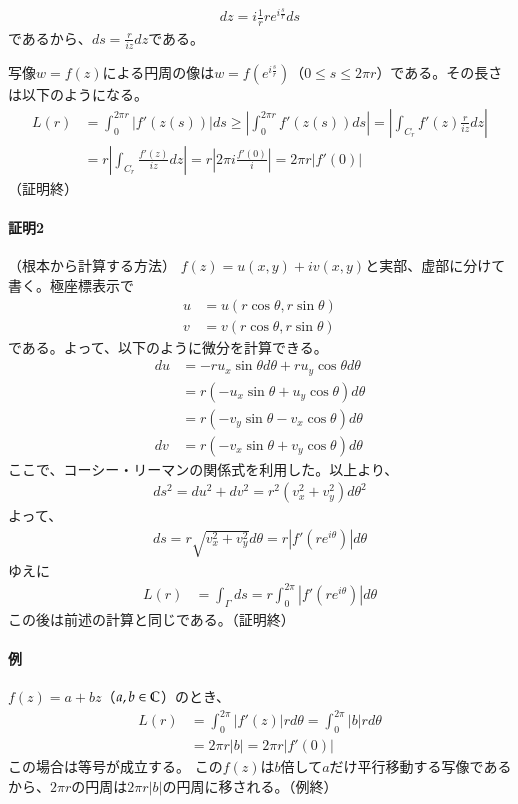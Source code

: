 \begin{align*}
    dz
    =i\frac{1}{r}re^{i\frac{s}{r}}ds
\end{align*}
であるから、$ds=\frac{r}{iz}dz$である。

写像$w=f(z)$による円周の像は$w=f(e^{i\frac{s}{r}})$（$0\le s\le2\pi r$）である。その長さは以下のようになる。
\begin{align*}
    L(r)&=\int_{0}^{2\pi r}|f'(z(s))|ds
    \ge \left|\int_{0}^{2\pi r}f'(z(s))ds\right|
    =\left|\int_{C_r}f'(z)\frac{r}{iz}dz\right|\\
    &=r\left|\int_{C_r}\frac{f'(z)}{iz}dz\right|
    =r\left|2\pi i \frac{f'(0)}{i}\right|
    =2\pi r|f'(0)|
\end{align*}
（証明終）
\paragraph{証明2}（根本から計算する方法）
$f(z)=u(x,y)+iv(x,y)$と実部、虚部に分けて書く。極座標表示で
\begin{align*}
    u&=u(r\cos\theta,r\sin\theta)\\
    v&=v(r\cos\theta,r\sin\theta)
\end{align*}
である。よって、以下のように微分を計算できる。
\begin{align*}
    du&=-ru_x\sin\theta d\theta+ru_y\cos\theta d\theta\\
    &=r(-u_x\sin\theta+u_y\cos\theta)d\theta\\
    &=r(-v_y\sin\theta-v_x\cos\theta)d\theta\\
    dv&=r(-v_x\sin\theta+v_y\cos\theta)d\theta
\end{align*}
ここで、コーシー・リーマンの関係式を利用した。以上より、
\begin{align*}
    ds^2=du^2+dv^2=r^2(v_x^2+v_y^2)d\theta^2
\end{align*}
よって、
\begin{align*}
    ds=r\sqrt{v_x^2+v_y^2}d\theta=r|f'(re^{i\theta})|d\theta
\end{align*}
ゆえに
\begin{align*}
    L(r)&=\int_{\Gamma}ds=r\int_{0}^{2\pi}|f'(re^{i\theta})|d\theta
\end{align*}
この後は前述の計算と同じである。（証明終）
\paragraph{例}
$f(z)=a+bz$（$a,b\in\mathbb{C}$）のとき、
\begin{align*}
    L(r)&=\int_{0}^{2\pi}|f'(z)|rd\theta=\int_{0}^{2\pi}|b|rd\theta\\
    &=2\pi r|b|=2\pi r|f'(0)|
\end{align*}
この場合は等号が成立する。
この$f(z)$は$b$倍して$a$だけ平行移動する写像であるから、$2\pi r$の円周は$2\pi r|b|$の円周に移される。（例終）


